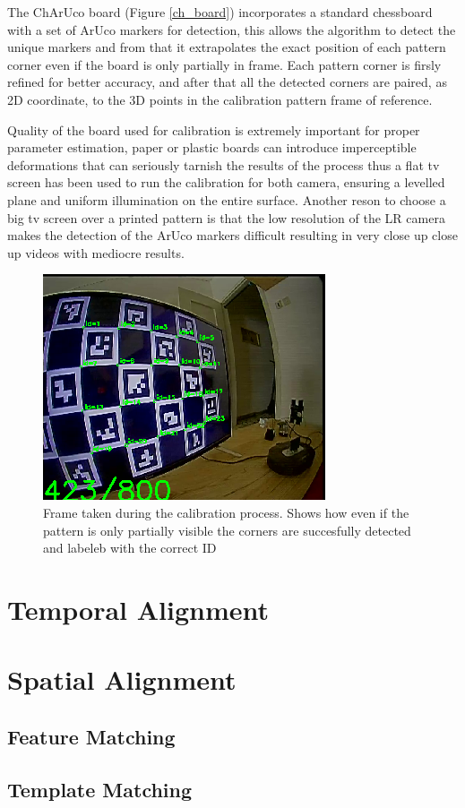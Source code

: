 The ChArUco board (Figure \ref{ch_board}) incorporates a standard chessboard with a set of ArUco markers for detection, this allows the algorithm to detect the unique markers and from that it extrapolates the exact position of each pattern corner even if the board is only partially in frame. Each pattern corner is firsly refined for better accuracy, and after that all the detected corners are paired, as 2D coordinate, to the 3D points in the calibration pattern frame of reference.

Quality of the board used for calibration is extremely important for proper parameter estimation, paper or plastic boards can introduce imperceptible deformations that can seriously tarnish the results of the process thus a flat tv screen has been used to run the calibration for both camera, ensuring a levelled plane and uniform illumination on the entire surface. Another reson to choose a big tv screen over a printed pattern is that the low resolution of the LR camera makes the detection of the ArUco markers difficult resulting in very close up close up videos with mediocre results.

\begin{figure}[h]
  \centering
  \includegraphics[scale=0.7]{figures/not_all.png}
  \caption{Frame taken during the calibration process. Shows how even if the pattern is only partially visible the corners are succesfully detected and labeleb with the correct ID}
  \label{img:ch_calib}
\end{figure}


\section{Temporal Alignment}
\label{sec:img_align}

\section{Spatial Alignment}
\label{sec:img_align}
\subsection {Feature Matching}
\label{subsec:feature_match}
\subsection {Template Matching}
\label{subsec:camera_calib}
